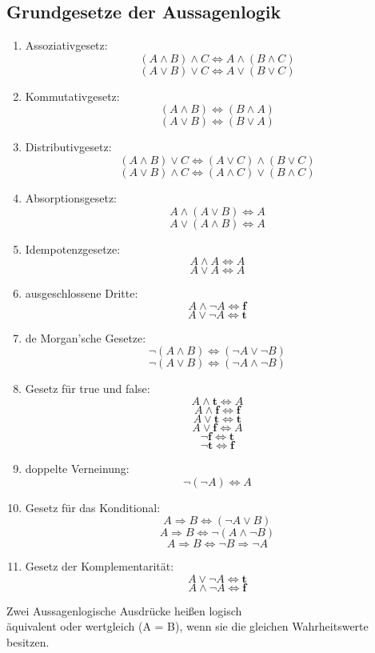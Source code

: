 \documentclass[../ana2u.tex]{subfiles}
\begin{document}
\subsection{Grundgesetze der Aussagenlogik}
\begin{enumerate}
    \item Assoziativgesetz:
    \[(A \wedge B) \wedge C \Leftrightarrow A \wedge (B \wedge C)\]
    \[(A \vee B) \vee C \Leftrightarrow A \vee (B \vee C)\]
    \item Kommutativgesetz:
    \[(A \wedge B) \Leftrightarrow (B \wedge A)\]
    \[(A \vee B) \Leftrightarrow (B \vee A)\]
    \item Distributivgesetz:
    \[(A \wedge B) \vee C \Leftrightarrow (A \vee C) \wedge (B \vee C)\]
    \[(A \vee B) \wedge C \Leftrightarrow (A \wedge C) \vee (B \wedge C)\]
    \item Absorptionsgesetz:
    \[A \wedge (A \vee B) \Leftrightarrow A\]
    \[A \vee (A \wedge B) \Leftrightarrow A\]
    \item Idempotenzgesetze:
    \[A \wedge A \Leftrightarrow A\]
    \[A \vee A \Leftrightarrow A\]
    \item ausgeschlossene Dritte:
    \[A \wedge \neg A \Leftrightarrow \textbf{f}\]
    \[A \vee \neg A \Leftrightarrow \textbf{t}\]
    \item de Morgan'sche Gesetze:
    \[\neg (A \wedge B) \Leftrightarrow (\neg A \vee \neg B)\]
    \[\neg (A \vee B) \Leftrightarrow (\neg A \wedge \neg B)\]
    \item Gesetz für true und false:
    \[A \wedge \textbf{t} \Leftrightarrow A\]
    \[A \wedge \textbf{f} \Leftrightarrow \textbf{f}\]
    \[A \vee \textbf{t} \Leftrightarrow \textbf{t}\]
    \[A \vee \textbf{f} \Leftrightarrow A\]
    \[\neg \textbf{f} \Leftrightarrow \textbf{t}\]
    \[\neg \textbf{t} \Leftrightarrow \textbf{f}\]
    \item doppelte Verneinung:
    \[\neg (\neg A) \Leftrightarrow A\]
    \item Gesetz für das Konditional:
    \[A \Rightarrow B \Leftrightarrow (\neg A \vee B)\]
    \[A \Rightarrow B \Leftrightarrow \neg (A \wedge \neg B)\]
    \[A \Rightarrow B \Leftrightarrow \neg B \Rightarrow \neg A\]
    \item Gesetz der Komplementarität:
    \[A \vee \neg A \Leftrightarrow \textbf{t}\]
    \[A \wedge \neg A \Leftrightarrow \textbf{f}\]
\end{enumerate}	
\begin{defi}
    Zwei Aussagenlogische Ausdrücke heißen logisch \\ 
    äquivalent oder wertgleich (A = B), wenn sie die gleichen Wahrheitswerte besitzen.
\end{defi}
\end{document}
